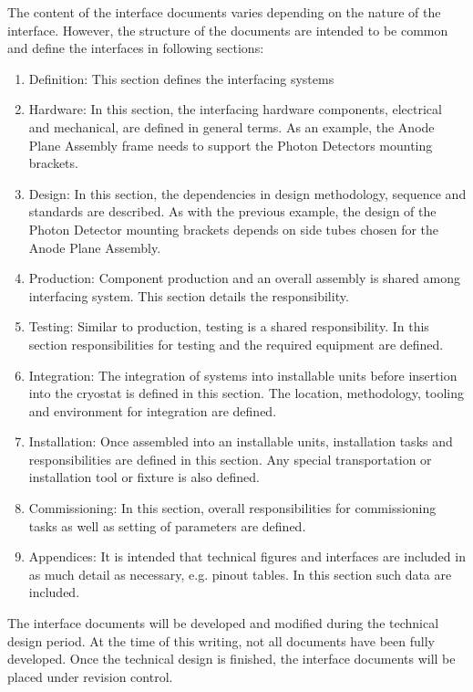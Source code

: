 The content of the interface documents varies depending on the nature
of the interface. However, the structure of the documents are intended
to be common and define the interfaces in following sections:
\begin{enumerate}
 \item Definition: This section defines the interfacing systems
 \item Hardware: In this section, the interfacing hardware components,
   electrical and mechanical, are defined in general terms. As an
   example, the Anode Plane Assembly frame needs to support the Photon
   Detectors mounting brackets.
 \item Design: In this section, the dependencies in design
   methodology, sequence and standards are described. As with the
   previous example, the design of the Photon Detector mounting
   brackets depends on side tubes chosen for the Anode Plane Assembly.
 \item Production: Component production and an overall assembly is
   shared among interfacing system. This section details the
   responsibility.
 \item Testing: Similar to production, testing is a shared
   responsibility. In this section responsibilities for testing and
   the required equipment are defined.
 \item Integration: The integration of systems into installable units
   before insertion into the cryostat is defined in this section. The
   location, methodology, tooling and environment for integration are
   defined.
 \item Installation: Once assembled into an installable units,
   installation tasks and responsibilities are defined in this
   section. Any special transportation or installation tool or fixture
   is also defined.
 \item Commissioning: In this section, overall responsibilities for
   commissioning tasks as well as setting of parameters are defined.
 \item  Appendices: It is intended that technical figures and interfaces
   are included in as much detail as necessary, e.g. pinout tables. In
   this section such data are included.
\end{enumerate}

The interface documents will be developed and modified during the
technical design period. At the time of this writing, not all
documents have been fully developed. Once the technical design is
finished, the interface documents will be placed under revision
control.
